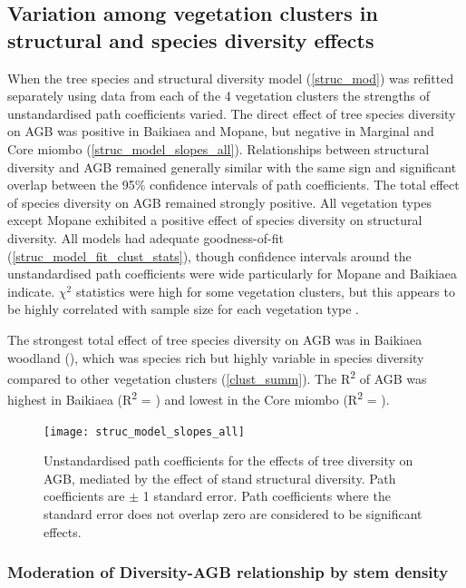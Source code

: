 \documentclass[11pt,a4paper]{article}
\begin{document}
\subsection{Variation among vegetation clusters in structural and species diversity effects}

When the tree species and structural diversity model (\autoref{struc_mod}) was refitted separately using data from each of the 4 vegetation clusters the strengths of unstandardised path coefficients varied.  The direct effect of tree species diversity on AGB was positive in Baikiaea and Mopane, but negative in Marginal and Core miombo (\autoref{struc_model_slopes_all}). Relationships between structural diversity and AGB remained generally similar with the same sign and significant overlap between the 95\% confidence intervals of path coefficients. The total effect of species diversity on AGB remained strongly positive. All vegetation types except Mopane exhibited a positive effect of species diversity on structural diversity. All models had adequate goodness-of-fit (\autoref{struc_model_fit_clust_stats}), though confidence intervals around the unstandardised path coefficients were wide particularly for Mopane and Baikiaea indicate. $\chi^{2}$ statistics were high for some vegetation clusters, but this appears to be highly correlated with sample size for each vegetation type \citep{}.

The strongest total effect of tree species diversity on AGB was in Baikiaea woodland (\struccsb{}), which was species rich but highly variable in species diversity compared to other vegetation clusters (\autoref{clust_summ}). The R\textsuperscript{2} of AGB was highest in Baikiaea (R\textsuperscript{2} = \struccrsq{}) and lowest in the Core miombo (R\textsuperscript{2} = \strucbrsq{}).

\begin{figure}[H]
\centering
	\texttt{[image: struc\_model\_slopes\_all]}
	\caption{Unstandardised path coefficients for the effects of tree diversity on AGB, mediated by the effect of stand structural diversity. Path coefficients are $\pm$ 1 standard error. Path coefficients where the standard error does not overlap zero are considered to be significant effects.}
	\label{struc_model_slopes_all}
\end{figure}



\subsubsection{Moderation of Diversity-AGB relationship by stem density}
\end{document}
